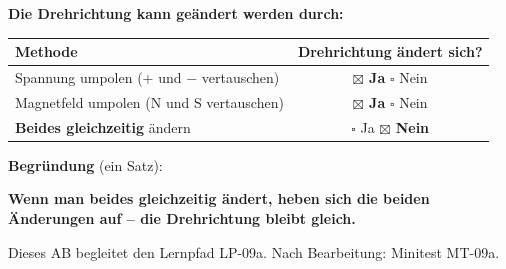 \documentclass[11pt, a4paper]{article}
\newcommand{\lsg}[1]{\textcolor{loesung}{\textbf{#1}}}
\begin{document}
\begin{merkkasten}

\textbf{Die Drehrichtung kann geändert werden durch:}

\vspace{2mm}
\begin{tabularx}{\textwidth}{|X|c|}
\hline
\textbf{Methode} & \textbf{Drehrichtung ändert sich?} \\
\hline
Spannung umpolen (+ und $-$ vertauschen) & \lsg{$\boxtimes$ Ja} \quad $\square$ Nein \\
\hline
Magnetfeld umpolen (N und S vertauschen) & \lsg{$\boxtimes$ Ja} \quad $\square$ Nein \\
\hline
\textbf{Beides gleichzeitig} ändern & $\square$ Ja \quad \lsg{$\boxtimes$ Nein} \\
\hline
\end{tabularx}

\vspace{3mm}
\textbf{Begründung} (ein Satz):

\vspace{2mm}
\lsg{Wenn man beides gleichzeitig ändert, heben sich die beiden Änderungen auf -- die Drehrichtung bleibt gleich.}

\end{merkkasten}


\vfill

\begin{center}
\small\textcolor{mittelgrau}{Dieses AB begleitet den Lernpfad LP-09a. Nach Bearbeitung: Minitest MT-09a.}
\end{center}
\end{document}
